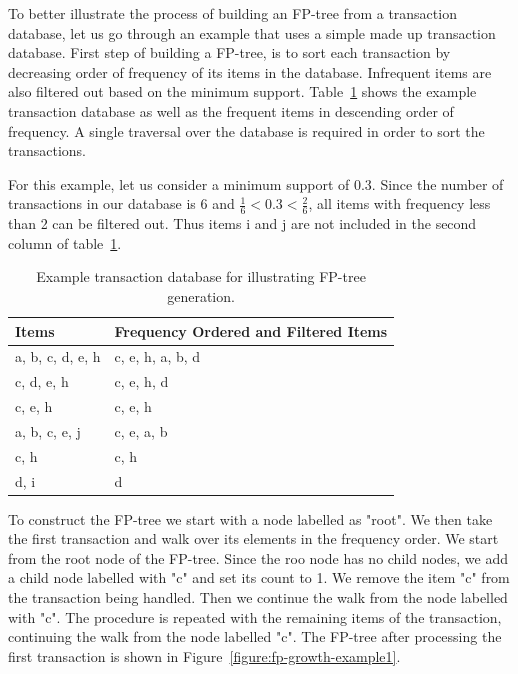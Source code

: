 To better illustrate the process of building an FP-tree from a transaction database, let us go through an example that uses a simple made up transaction database. First step of building a FP-tree, is to sort each transaction by decreasing order of frequency of its items in the database. Infrequent items are also filtered out based on the minimum support. Table~\ref{table:fp-growth-example1} shows the example transaction database as well as the frequent items in descending order of frequency. A single traversal over the database is required in order to sort the transactions.

For this example, let us consider a minimum support of 0.3. Since the number of transactions in our database is 6 and $ \frac{1}{6} < 0.3 < \frac{2}{6} $, all items with frequency less than 2 can be filtered out. Thus items i and j are not included in the second column of table~\ref{table:fp-growth-example1}. 

\begin{table}[!htbp]
\begin{center}
    \begin{tabular}{ | l | l | }
    \hline
	\textbf{Items} & \textbf{Frequency Ordered and Filtered Items} \\ \hline
    a, b, c, d, e, h & c, e, h, a, b, d \\ \hline 
    c, d, e, h & c, e, h, d \\ \hline 
    c, e, h & c, e, h \\ \hline 
    a, b, c, e, j & c, e, a, b \\ \hline 
    c, h & c, h \\ \hline
    d, i & d \\ \hline
    \end{tabular}
    \caption{Example transaction database for illustrating FP-tree generation.}
    \label{table:fp-growth-example1}
\end{center}
\end{table} 

To construct the FP-tree we start with a node labelled as "root". We then take the first transaction and walk over its elements in the frequency order. We start from the root node of the FP-tree. Since the roo node has no child nodes, we add a child node labelled with "c" and set its count to 1. We remove the item "c" from the transaction being handled. Then we continue the walk from the node labelled with "c". The procedure is repeated with the remaining items of the transaction, continuing the walk from the node labelled "c". The FP-tree after processing the first transaction is shown in Figure~\ref{figure:fp-growth-example1}.

